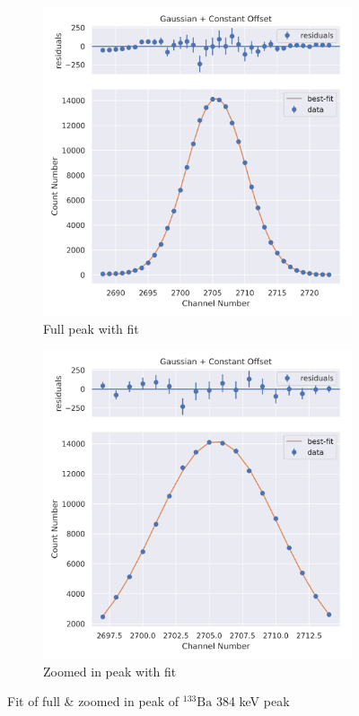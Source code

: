 \documentclass[11pt,a4paper]{article}
\newcommand{\element}[2]{$^{#2}\textrm{#1}$}
\begin{document}
\begin{figure}[H]
  \centering
  \begin{subfigure}{.5\linewidth}
    \centering
    \includegraphics[width=\linewidth]{./Images/Barium133/Gauss/Gauss_7_Full.png}
    \caption{Full peak with fit}
  \end{subfigure}%
  \begin{subfigure}{.5\linewidth}
    \centering
    \includegraphics[width=\linewidth]{./Images/Barium133/Gauss/Gauss_7_Zoom.png}
    \caption{Zoomed in peak with fit}
  \end{subfigure}
  \caption{Fit of full \& zoomed in peak of \element{Ba}{133} 384 keV peak}
\end{figure}
\clearpage
\end{document}
